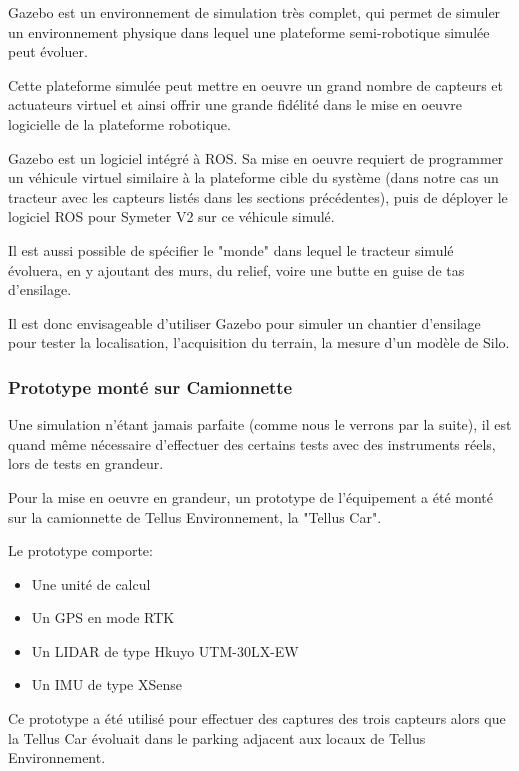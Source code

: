 \documentclass[12pt,a4paper]{report}
\begin{document}
			Gazebo est un environnement de simulation très complet, qui permet de simuler un environnement physique dans lequel une plateforme semi-robotique simulée peut évoluer. 
			
			\para Cette plateforme simulée peut mettre en oeuvre un grand nombre de capteurs et actuateurs virtuel et ainsi offrir une grande fidélité dans le mise en oeuvre logicielle de la plateforme robotique.
			
			\para Gazebo est un logiciel intégré à ROS. Sa mise en oeuvre requiert de programmer un véhicule virtuel similaire à la plateforme cible du système (dans notre cas un tracteur avec les capteurs listés dans les sections précédentes), puis de déployer le logiciel ROS pour Symeter V2 sur ce véhicule simulé. 
			
			\para Il est aussi possible de spécifier le "monde" dans lequel le tracteur simulé évoluera, en y ajoutant des murs, du relief, voire une butte en guise de tas d'ensilage.

			
			\para Il est donc envisageable d'utiliser Gazebo pour simuler un chantier d'ensilage pour tester la localisation, l'acquisition du terrain, la mesure d'un modèle de Silo.
			
			\subsubsection{Prototype monté sur Camionnette}
			
			Une simulation n'étant jamais parfaite (comme nous le verrons par la suite), il est quand même nécessaire d'effectuer des certains tests avec des instruments réels, lors de tests en grandeur.
		
			\para Pour la mise en oeuvre en grandeur, un prototype de l'équipement a été monté sur la camionnette de Tellus Environnement, la "Tellus Car".
			
			\para Le prototype comporte:
			\begin{itemize}
				\item Une unité de calcul
				\item Un GPS en mode RTK
				\item Un LIDAR de type Hkuyo UTM-30LX-EW
				\item Un IMU de type XSense
			\end{itemize}
		
			\para Ce prototype a été utilisé pour effectuer des captures des trois capteurs alors que la Tellus Car évoluait dans le parking adjacent aux locaux de Tellus Environnement.
		
\end{document}
